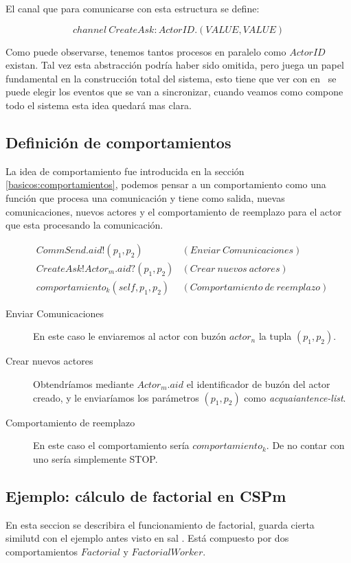 El canal que para comunicarse con esta estructura se define:

\[
channel\ CreateAsk:ActorID.(VALUE, VALUE)
\]

Como puede observarse, tenemos tantos procesos en paralelo como $ActorID$ existan. Tal vez esta abstracción podría haber sido omitida, pero juega un papel fundamental en la construcción total del sistema, esto tiene que ver con en \CSP\ se puede elegir los eventos \cite[chap.~2,p.~55]{Roscoe:1997:TPC:550448} que se van a sincronizar, cuando veamos como compone todo el sistema esta idea quedará mas clara.

\subsection{Definición de comportamientos}
La idea de comportamiento fue introducida en la sección \ref{basicos:comportamientos}, podemos pensar a un comportamiento como una función que procesa una comunicación y tiene como salida, nuevas comunicaciones, nuevos actores y el comportamiento de reemplazo para el actor que esta procesando la comunicación.

\begin{align*}
&CommSend.aid!(p_1, p_2) & (Enviar\ Comunicaciones) \\ 
&CreateAsk!Actor_m.aid?(p_1, p_2) & (Crear\ nuevos\ actores)\\
&comportamiento_k(self, p_1, p_2)  & (Comportamiento\ de\ reemplazo)
\end{align*}

\begin{description}
\item [Enviar Comunicaciones] En este caso le enviaremos al actor con buzón $actor_n$ la tupla $(p_1, p_2)$. 
\item [Crear nuevos actores] Obtendríamos mediante $Actor_m.aid$ el identificador de buzón del actor creado, y le enviaríamos los parámetros $(p_1, p_2)$ como \textit{acquaiantence-list}.
\item [Comportamiento de reemplazo] En este caso el comportamiento sería $comportamiento_k$. De no contar con uno sería simplemente STOP.
\end{description}

\subsection{Ejemplo: cálculo de factorial en CSPm}
En esta seccion se describira el funcionamiento de factorial, guarda cierta similutd con el ejemplo antes visto en sal \SAL. Está compuesto por dos comportamientos $Factorial$ y $FactorialWorker$.

